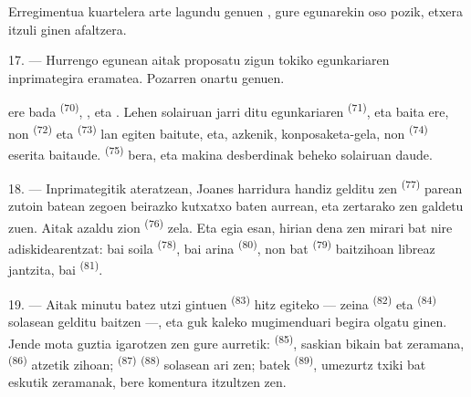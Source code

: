 Erregimentua kuartelera arte lagundu genuen , gure egunarekin oso
pozik, etxera itzuli ginen afaltzera.

\VUsaut{3.0mm}

17. --- Hurrengo egunean aitak proposatu zigun tokiko egunkariaren inprimategira
eramatea. Pozarren onartu genuen.

  ere bada
\textsuperscript{(70)}, ,  eta
. Lehen solairuan jarri ditu egunkariaren
 \textsuperscript{(71)}, eta baita 
ere, non  \textsuperscript{(72)} eta 
\textsuperscript{(73)} lan egiten baitute, eta, azkenik, konposaketa-gela, non
 \textsuperscript{(74)} eserita baitaude. 
\textsuperscript{(75)} bera,  eta makina desberdinak
beheko solairuan daude.

\VUsaut{3.0mm}

18. --- Inprimategitik ateratzean, Joanes harridura handiz gelditu zen
 \textsuperscript{(77)} parean zutoin batean zegoen
beirazko kutxatxo baten aurrean, eta zertarako zen galdetu zuen. Aitak azaldu zion
 \textsuperscript{(76)} zela. Eta egia esan, hirian dena
zen mirari bat nire adiskidearentzat: bai 
soila \textsuperscript{(78)}, bai  arina
\textsuperscript{(80)}, non  bat \textsuperscript{(79)} baitzihoan
libreaz jantzita, bai  \textsuperscript{(81)}.

19. --- Aitak minutu batez utzi gintuen 
\textsuperscript{(83)} hitz egiteko --- zeina 
\textsuperscript{(82)} eta  \textsuperscript{(84)} solasean
gelditu baitzen ---, eta guk kaleko mugimenduari begira olgatu ginen. Jende mota
guztia igarotzen zen gure aurretik: 
\textsuperscript{(85)}, saskian  bikain bat zeramana,
 \textsuperscript{(86)} atzetik zihoan;
 \textsuperscript{(87)} 
\textsuperscript{(88)} solasean ari zen;  batek
\textsuperscript{(89)}, umezurtz txiki bat eskutik zeramanak, bere komentura
itzultzen zen.

